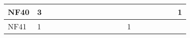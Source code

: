 \begin{table}[]
{\begin{tabular}{|l|l|l|l|l|l|l|l|l|l|l|l|l|l|l|l|l|l|l|}
NF40 & 3                                                     &                                                  &    &    &    &    &                                                  &    &    &    &    &                                                   &    &                                                   &    &                                                             &                                                             & 1                                                           \\ \hline
NF41 & 1                                                     &                                                  &    &    &    &    &                                                  &    &    &    &    & 1                                                 &    &                                                   &    &                                                             &                                                             &                                                             \\ \hline
\end{tabular}
}\end{table}